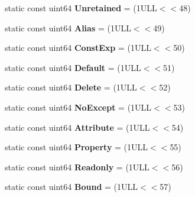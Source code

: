 \begin{DoxyCompactItemize}
\item 
\hypertarget{class_entry_a61bf7fa059ac0b1eb8c243bef3c5e5b6}{static const uint64 {\bfseries Unretained} = (1\-U\-L\-L$<$$<$48)}\label{class_entry_a61bf7fa059ac0b1eb8c243bef3c5e5b6}

\item 
\hypertarget{class_entry_aa1aec4360744c5de6187875757aca55d}{static const uint64 {\bfseries Alias} = (1\-U\-L\-L$<$$<$49)}\label{class_entry_aa1aec4360744c5de6187875757aca55d}

\item 
\hypertarget{class_entry_ad102a60ca7fc04ba3e974e58076e30a0}{static const uint64 {\bfseries Const\-Exp} = (1\-U\-L\-L$<$$<$50)}\label{class_entry_ad102a60ca7fc04ba3e974e58076e30a0}

\item 
\hypertarget{class_entry_a91674b60f1520366e44a48f57309f1cf}{static const uint64 {\bfseries Default} = (1\-U\-L\-L$<$$<$51)}\label{class_entry_a91674b60f1520366e44a48f57309f1cf}

\item 
\hypertarget{class_entry_a0cff8bb2f7efc049b59a65735b093cb3}{static const uint64 {\bfseries Delete} = (1\-U\-L\-L$<$$<$52)}\label{class_entry_a0cff8bb2f7efc049b59a65735b093cb3}

\item 
\hypertarget{class_entry_aa14389baa12c2800f010ed33b3fb04d1}{static const uint64 {\bfseries No\-Except} = (1\-U\-L\-L$<$$<$53)}\label{class_entry_aa14389baa12c2800f010ed33b3fb04d1}

\item 
\hypertarget{class_entry_a67d649daf5b928759597e1f52d5aa212}{static const uint64 {\bfseries Attribute} = (1\-U\-L\-L$<$$<$54)}\label{class_entry_a67d649daf5b928759597e1f52d5aa212}

\item 
\hypertarget{class_entry_afa75e8bcb10826642331314eba1f85d6}{static const uint64 {\bfseries Property} = (1\-U\-L\-L$<$$<$55)}\label{class_entry_afa75e8bcb10826642331314eba1f85d6}

\item 
\hypertarget{class_entry_acc065c94e57bcf994bb28a5ecba65fb8}{static const uint64 {\bfseries Readonly} = (1\-U\-L\-L$<$$<$56)}\label{class_entry_acc065c94e57bcf994bb28a5ecba65fb8}

\item 
\hypertarget{class_entry_adf9fb8196ee2db26a7b9a07897f2643c}{static const uint64 {\bfseries Bound} = (1\-U\-L\-L$<$$<$57)}\label{class_entry_adf9fb8196ee2db26a7b9a07897f2643c}


\end{DoxyCompactItemize}
